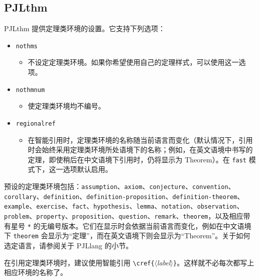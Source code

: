 \documentclass[Chinese,English,French,allowbf,puretext]{lebhart}
\providecommand{\meta}[1]{$\langle${\normalfont\itshape#1}$\rangle$}
\newenvironment{tip}[1][提示]{%
    \begin{tcolorbox}[breakable,
        enhanced,
        width = \textwidth,
        colback = paper, colbacktitle = paper,
        colframe = gray!50, boxrule=0.2mm,
        coltitle = black,
        fonttitle = \sffamily,
        attach boxed title to top left = {yshift=-\tcboxedtitleheight/2, xshift=.5cm},
        boxed title style = {boxrule=0pt, colframe=paper},
        before skip = 0.3cm,
        after skip = 0.3cm,
        top = 3mm,
        bottom = 3mm,
        title={\scshape\sffamily #1}]%
}{\end{tcolorbox}}
\providecommand{\PJLlang}{\textsf{PJLlang}}
\providecommand{\PJLthm}{\textsf{PJLthm}}
\begin{document}
\subsection{PJLthm}

\PJLthm{} 提供定理类环境的设置。它支持下列选项：
\begin{itemize}
    \item \texttt{nothms}
    \begin{itemize}
        \item 不设定定理类环境。如果你希望使用自己的定理样式，可以使用这一选项。
    \end{itemize}
    \item \texttt{nothmnum}
    \begin{itemize}
        \item 使定理类环境均不编号。
    \end{itemize}
    \item \texttt{regionalref}
    \begin{itemize}
        \item 在智能引用时，定理类环境的名称随当前语言而变化（默认情况下，引用时会始终采用定理类环境所处语境下的名称；例如，在英文语境中书写的定理，即使稍后在中文语境下引用时，仍将显示为 Theorem）。在 \texttt{fast} 模式下，这一选项默认启用。
    \end{itemize}
\end{itemize}

预设的定理类环境包括：\texttt{assumption}、\texttt{axiom}、\texttt{conjecture}、\texttt{convention}、\texttt{corollary}、\texttt{definition}、\texttt{definition-proposition}、\texttt{definition-theorem}、\texttt{example}、\texttt{exercise}、\texttt{fact}、\texttt{hypothesis}、\texttt{lemma}、\texttt{notation}、\texttt{observation}、\texttt{problem}、\texttt{property}、\texttt{proposition}、\texttt{question}、\texttt{remark}、\texttt{theorem}，以及相应带有星号 \lstinline|*| 的无编号版本。它们在显示时会依据当前语言而变化，例如在中文语境下 \texttt{theorem} 会显示为“定理”，而在英文语境下则会显示为“Theorem”。关于如何选定语言，请参阅关于 \PJLlang{} 的小节。

\begin{tip}
    在引用定理类环境时，建议使用智能引用 \lstinline|\cref{|\meta{label}\lstinline|}|。这样就不必每次都写上相应环境的名称了。
\end{tip}

\medskip
\end{document}
